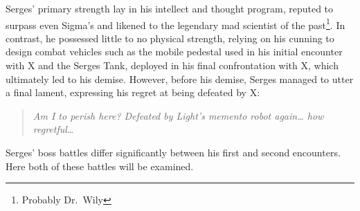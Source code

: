 Serges' primary strength lay in his intellect and thought program, reputed to surpass even Sigma's and likened to the legendary mad scientist of the past\footnote{Probably Dr.~Wily}. In contrast, he possessed little to no physical strength, relying on his cunning to design combat vehicles such as the mobile pedestal used in his initial encounter with X and the Serges Tank, deployed in his final confrontation with X, which ultimately led to his demise. However, before his demise, Serges managed to utter a final lament, expressing his regret at being defeated by X:
\begin{quote}
	\textit{Am I to perish here? Defeated by Light’s memento robot again… how regretful…}~\cite{wordpress:X2_japanese_script}
\end{quote}

Serges' boss battles differ significantly between his first and second encounters. Here both of these battles will be examined.

